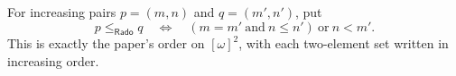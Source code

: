 \begin{definition}
For increasing pairs $p=(m,n)$ and $q=(m',n')$, put
\[
p\leq_{\mathsf{Rado}}q
\quad\Longleftrightarrow\quad
(m=m'\ \text{and}\ n\leq n')\ \text{or}\ n<m'.
\]
This is exactly the paper's order on $[\omega]^2$, with each two-element
set written in increasing order.
\end{definition}
